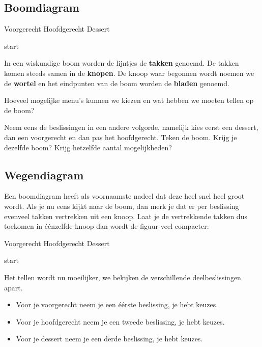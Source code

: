 \documentclass[12pt,twoside]{article}
\begin{document}
\begin{theorie}
\subsection{Boomdiagram}

\hspace*{2cm} Voorgerecht \hfill Hoofdgerecht \hfill Dessert \hspace*{2cm}

\vspace*{8cm}
start
\vspace*{8cm}

In een wiskundige boom worden de lijntjes de {\bf takken} genoemd. De takken komen steeds samen in de {\bf knopen}. De knoop waar begonnen wordt noemen we de {\bf wortel} en het eindpunten van de boom worden de {\bf bladen} genoemd.

Hoeveel mogelijke menu's kunnen we kiezen en wat hebben we moeten tellen op de boom?

Neem eens de beslissingen in een andere volgorde, namelijk kies eerst een dessert, dan een voorgerecht en dan pas het hoofdgerecht. Teken de boom. Krijg je dezelfde boom? Krijg hetzelfde aantal mogelijkheden?

\subsection{Wegendiagram}

Een boomdiagram heeft als voornaamste nadeel dat deze heel snel heel groot wordt. Als je nu eens kijkt naar de boom, dan merk je dat er per beslissing evenveel takken vertrekken uit een knoop. Laat je de vertrekkende takken dus toekomen in éénzelfde knoop dan wordt de figuur veel compacter:

\hspace*{2cm} Voorgerecht \hfill Hoofdgerecht \hfill Dessert \hspace*{2cm}

\vspace*{3cm}
start
\vspace*{3cm}

Het tellen wordt nu moeilijker, we bekijken de verschillende deelbeslissingen apart.
\begin{itemize}
  \item Voor je voorgerecht neem je een éérste beslissing, je hebt \arule{2cm} keuzes.
  \item Voor je hoofdgerecht neem je een tweede beslissing, je hebt \arule{2cm} keuzes.
  \item Voor je dessert neem je een derde beslissing, je hebt \arule{2cm} keuzes.
\end{itemize}


\end{theorie}
\end{document}
